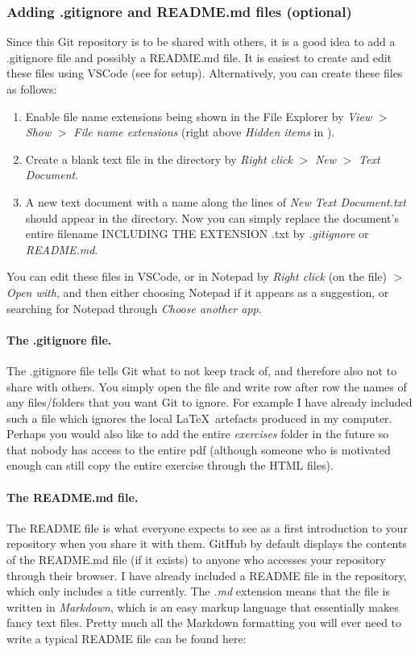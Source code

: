 \documentclass[a4paper,10pt]{article}
\begin{document}
\subsubsection{Adding .gitignore and README.md files (optional)}
\label{sec:gitignore}

Since this Git repository is to be shared with others, it is a good idea to add a .gitignore file and possibly a README.md file. It is easiest to create and edit these files using VSCode (see  for setup). Alternatively, you can create these files as follows:
\begin{enumerate}
    \item Enable file name extensions being shown in the File Explorer by \emph{View} $>$ \emph{Show} $>$ \emph{File name extensions} (right above \emph{Hidden items} in ).
    \item Create a blank text file in the directory by \emph{Right click} $>$ \emph{New} $>$ \emph{Text Document}.
    \item A new text document with a name along the lines of \emph{New Text Document.txt} should appear in the directory. Now you can simply replace the document's entire filename INCLUDING THE EXTENSION .txt by \emph{.gitignore} or \emph{README.md}.
\end{enumerate}
You can edit these files in VSCode, or in Notepad by \emph{Right click} (on the file) $>$ \emph{Open with}, and then either choosing Notepad if it appears as a suggestion, or searching for Notepad through \emph{Choose another app}.

\paragraph{The .gitignore file.} The .gitignore file tells Git what to not keep track of, and therefore also not to share with others. You simply open the file and write row after row the names of any files/folders that you want Git to ignore. For example I have already included such a file which ignores the local \LaTeX\ artefacts produced in my computer. Perhaps you would also like to add the entire \emph{exercises} folder in the future so that nobody has access to the entire pdf (although someone who is motivated enough can still copy the entire exercise through the HTML files).

\paragraph{The README.md file.} The README file is what everyone expects to see as a first introduction to your repository when you share it with them. GitHub by default displays the contents of the README.md file (if it exists) to anyone who accesses your repository through their browser. I have already included a README file in the repository, which only includes a title currently. The \emph{.md} extension means that the file is written in \emph{Markdown}, which is an easy markup language that essentially makes fancy text files. Pretty much all the Markdown formatting you will ever need to write a typical README file can be found here:
\end{document}
